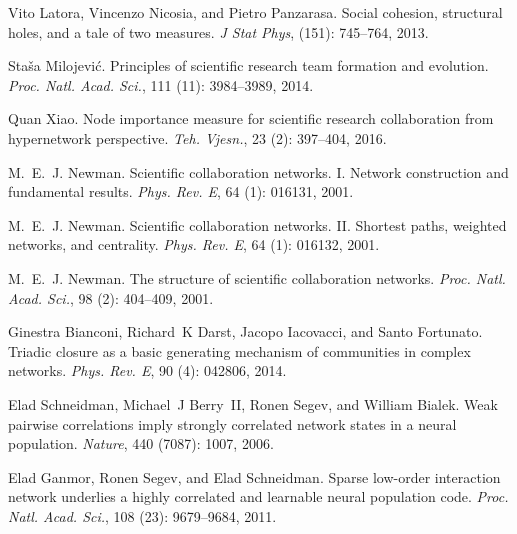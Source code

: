 Vito Latora, Vincenzo Nicosia, and Pietro Panzarasa.
\newblock Social cohesion, structural holes, and a tale of two measures.
\newblock \emph{J Stat Phys},  (151): 745--764, 2013.

Sta{\v s}a Milojevi{\'c}.
\newblock Principles of scientific research team formation and evolution.
\newblock \emph{Proc. Natl. Acad. Sci.}, 111 (11):
3984--3989, 2014.

Quan Xiao.
\newblock Node importance measure for scientific research collaboration from
hypernetwork perspective.
\newblock \emph{Teh. Vjesn.}, 23 (2): 397--404, 2016.

M.~E.~J. Newman.
\newblock Scientific collaboration networks. {{I}}. {{Network}} construction
and fundamental results.
\newblock \emph{Phys. Rev. E}, 64 (1): 016131,
2001{}.

M.~E.~J. Newman.
\newblock Scientific collaboration networks. {{II}}. {{Shortest}} paths,
weighted networks, and centrality.
\newblock \emph{Phys. Rev. E}, 64 (1): 016132,
2001{}.

M.~E.~J. Newman.
\newblock The structure of scientific collaboration networks.
\newblock \emph{Proc. Natl. Acad. Sci.}, 98 (2): 404--409,
2001{}.

Ginestra Bianconi, Richard~K Darst, Jacopo Iacovacci, and Santo Fortunato.
\newblock Triadic closure as a basic generating mechanism of communities in
complex networks.
\newblock \emph{Phys. Rev. E}, 90 (4): 042806, 2014.

Elad Schneidman, Michael~J Berry~II, Ronen Segev, and William Bialek.
\newblock Weak pairwise correlations imply strongly correlated network states
in a neural population.
\newblock \emph{Nature}, 440 (7087): 1007, 2006.

Elad Ganmor, Ronen Segev, and Elad Schneidman.
\newblock Sparse low-order interaction network underlies a highly correlated
and learnable neural population code.
\newblock \emph{Proc. Natl. Acad. Sci.}, 108 (23):
9679--9684, 2011.

